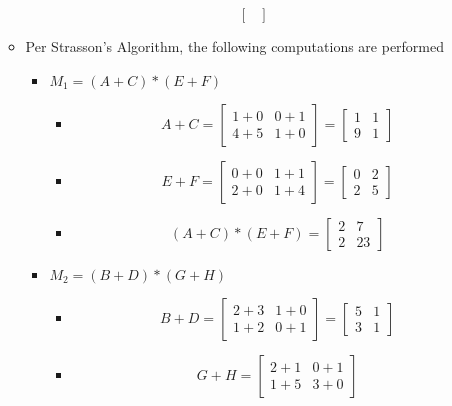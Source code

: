 \documentclass{article}
\begin{document}
\begin{itemize}
\begin{itemize}
\[\begin{bmatrix}
				\end{bmatrix}
			\]
		\item Per Strasson's Algorithm, the following computations are performed
			\begin{itemize}
				\item $M_1 = (A + C) * (E + F)$
					\begin{itemize}
						\item 
							\[
								A + C = 
								\begin{bmatrix}
								1 + 0 & 0 + 1 \\
								4 + 5 & 1 + 0
								\end{bmatrix}
								= 
								\begin{bmatrix}
								1 & 1 \\
								9 & 1
								\end{bmatrix}
							\]
						\item
							\[
							E + F = 
							\begin{bmatrix}
							0 + 0 & 1 + 1 \\
							2 + 0 & 1 + 4
							\end{bmatrix}
							= 
							\begin{bmatrix}
							0 & 2 \\
							2 & 5
							\end{bmatrix}
							\]
						\item
							\[
								(A + C) * (E + F) = 
								\begin{bmatrix}
								2 & 7 \\
								2 & 23
								\end{bmatrix}
							\]
					\end{itemize}
				\item $M_2 = (B + D) * (G + H)$
					\begin{itemize}
						\item 
						\[
						B + D = 
						\begin{bmatrix}
						2 + 3 & 1 + 0 \\
						1 + 2 & 0 + 1
						\end{bmatrix}
						= 
						\begin{bmatrix}
						5 & 1 \\
						3 & 1
						\end{bmatrix}
						\]
						\item
						\[
						G + H = 
						\begin{bmatrix}
						2 + 1 & 0 + 1 \\
						1 + 5 & 3 + 0
						\end{bmatrix}
\]
\end{itemize}
\end{itemize}
\end{itemize}
\end{itemize}
\end{document}
